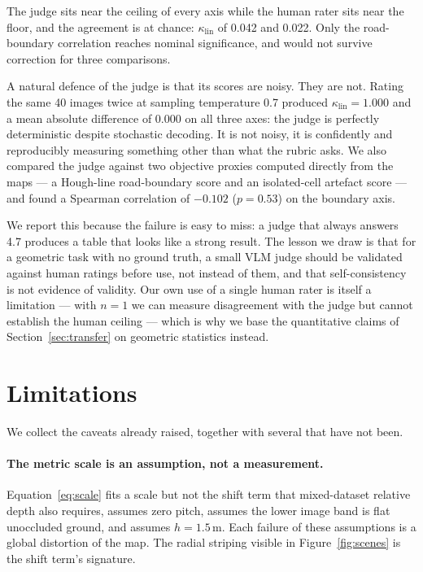 \documentclass[sigconf]{acmart}
\begin{document}
The judge sits near the ceiling of every axis while the human rater sits near the floor, and the agreement is at chance: $\kappa_{\text{lin}}$ of 0.042 and 0.022. Only the road-boundary correlation reaches nominal significance, and would not survive correction for three comparisons.

A natural defence of the judge is that its scores are noisy. They are not. Rating the same 40 images twice at sampling temperature 0.7 produced $\kappa_{\text{lin}} = 1.000$ and a mean absolute difference of 0.000 on all three axes: the judge is perfectly deterministic despite stochastic decoding. It is not noisy, it is confidently and reproducibly measuring something other than what the rubric asks. We also compared the judge against two objective proxies computed directly from the maps --- a Hough-line road-boundary score and an isolated-cell artefact score --- and found a Spearman correlation of $-0.102$ ($p = 0.53$) on the boundary axis.

We report this because the failure is easy to miss: a judge that always answers 4.7 produces a table that looks like a strong result. The lesson we draw is that for a geometric task with no ground truth, a small VLM judge should be validated against human ratings before use, not instead of them, and that self-consistency is not evidence of validity. Our own use of a single human rater is itself a limitation --- with $n = 1$ we can measure disagreement with the judge but cannot establish the human ceiling --- which is why we base the quantitative claims of Section~\ref{sec:transfer} on geometric statistics instead.

\section{Limitations}\label{sec:limits}

We collect the caveats already raised, together with several that have not been.

\paragraph{The metric scale is an assumption, not a measurement.} Equation~\eqref{eq:scale} fits a scale but not the shift term that mixed-dataset relative depth also requires, assumes zero pitch, assumes the lower image band is flat unoccluded ground, and assumes $h = 1.5$\,m. Each failure of these assumptions is a global distortion of the map. The radial striping visible in Figure~\ref{fig:scenes} is the shift term's signature.
\end{document}
